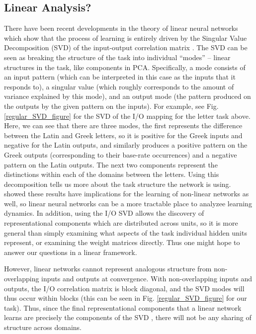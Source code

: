 \documentclass[10pt,letterpaper]{article}
\begin{document}
\subsection{Linear Analysis?}
There have been recent developments in the theory of linear neural networks which show that the process of learning is entirely driven by the Singular Value Decomposition (SVD) of the input-output correlation matrix \citep{Saxe2013}. The SVD can be seen as breaking the structure of the task into individual ``modes'' -- linear structures in the task, like components in PCA. Specifically, a mode consists of an input pattern (which can be interpreted in this case as the inputs that it responds to), a singular value (which roughly corresponds to the amount of variance explained by this mode), and an output mode (the pattern produced on the outputs by the given pattern on the inputs). For example, see Fig. \ref{regular_SVD_figure} for the SVD of the I/O mapping for the letter task above. Here, we can see that there are three modes, the first represents the difference between the Latin and Greek letters, so it is positive for the Greek inputs and negative for the Latin outputs, and similarly produces a positive pattern on the Greek outputs (corresponding to their base-rate occurrences) and a negative pattern on the Latin outputs. The next two components represent the distinctions within each of the domains between the letters. Using this decomposition tells us more about the task structure the network is using. \citet{Saxe2013} showed these results have implications for the learning of non-linear networks as well, so linear neural networks can be a more tractable place to analyzee learning dynamics. In addition, using the I/O SVD allows the discovery of representational components which are distributed across units, so it is more general than simply examining what aspects of the task individual hidden units represent, or examining the weight matrices directly. Thus one might hope to answer our questions in a linear framework. \par
However, linear networks cannot represent analogous structure from non-overlapping inputs and outputs at convergence. With non-overlapping inputs and outputs, the I/O correlation matrix is block diagonal, and the SVD modes will thus occur within blocks (this can be seen in Fig. \ref{regular_SVD_figure} for our task). Thus, since the final representational components that a linear network learns are precisely the components of the SVD \citep{Saxe2013}, there will not be any sharing of structure across domains.\par 
\end{document}
